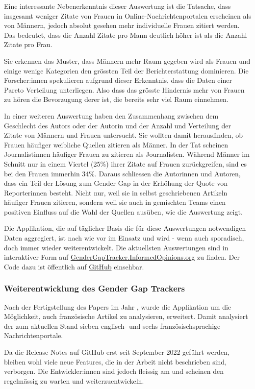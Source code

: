 Eine interessante Nebenerkenntnis dieser Auswertung ist die Tatsache, dass insgesamt weniger Zitate von Frauen in Online-Nachrichtenportalen
erscheinen als von Männern, jedoch absolut gesehen mehr individuelle Frauen zitiert werden. Das bedeutet, dass die Anzahl Zitate pro Mann
deutlich höher ist als die Anzahl Zitate pro Frau.

Sie erkennen das Muster, dass Männern mehr Raum gegeben wird als Frauen und einige wenige Kategorien den grössten Teil der Berichterstattung
dominieren. Die Forscher:innen spekulieren aufgrund dieser Erkenntnis, dass die Daten einer Pareto Verteilung unterliegen. Also dass das
grösste Hindernis mehr von Frauen zu hören die Bevorzugung derer ist, die bereits sehr viel Raum einnehmen.

In einer weiteren Auswertung haben \citeauthor{gender_gap_tracker} den Zusammenhang zwischen dem Geschlecht des
Autors oder der Autorin und der Anzahl und Verteilung der Zitate von Männern und Frauen untersucht. Sie wollten
damit herausfinden, ob Frauen häufiger weibliche Quellen zitieren als Männer. In der Tat scheinen Journalistinnen
häufiger Frauen zu zitieren als Journalisten. Während Männer im Schnitt nur in einem Viertel (25\%) ihrer Zitate auf Frauen
zurückgreifen, sind es bei den Frauen immerhin 34\%. Daraus schliessen die Autorinnen und Autoren, dass ein Teil der Lösung zum
Gender Gap in der Erhöhung der Quote von Reporterinnen besteht. Nicht nur, weil sie in selbst geschriebenen Artikeln
häufiger Frauen zitieren, sondern weil sie auch in gemischten Teams einen positiven Einfluss auf die Wahl der Quellen
ausüben, wie die Auswertung zeigt.

Die Applikation, die auf täglicher Basis die für diese Auswertungen notwendigen Daten aggregiert, ist nach wie vor im Einsatz und wird - wenn auch sporadisch, 
doch immer wieder weiterentwickelt. Die aktuellsten Auswertungen sind in interaktiver Form auf \href{https://gendergaptracker.informedopinions.org/
}{GenderGapTracker.InformedOpinions.org} zu finden. Der Code dazu ist öffentlich auf \href{https://github.com/sfu-discourse-lab/GenderGapTracker}{GitHub} einsehbar.


\subsubsection{Weiterentwicklung des Gender Gap Trackers}
Nach der Fertigstellung des Papers im Jahr \citeyear{gender_gap_tracker}, wurde die Applikation um die Möglichkeit, auch französische Artikel
zu analysieren, erweitert. Damit analysiert der  zum aktuellen Stand sieben englisch- und sechs französischsprachige Nachrichtenportale.

Da die Release Notes auf GitHub erst seit September 2022 geführt werden, bleiben wohl viele neue Features, die in der Arbeit nicht beschrieben sind,
verborgen. Die Entwickler:innen sind jedoch fleissig am  und scheinen den  regelmässig zu warten und weiterzuentwickeln.